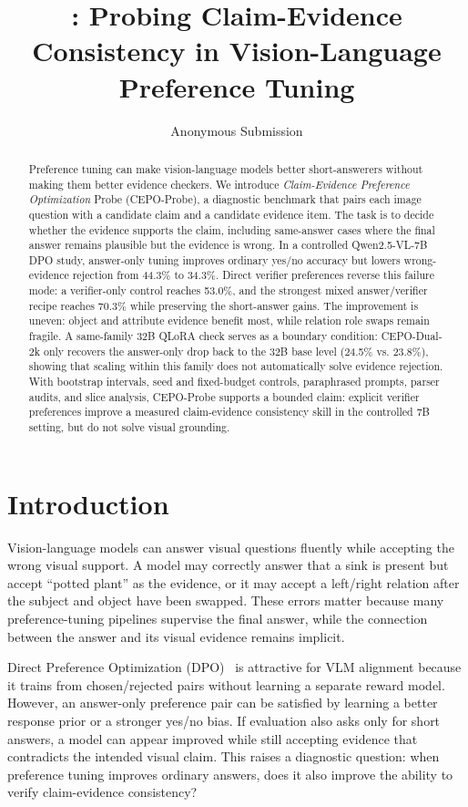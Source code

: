 \documentclass[10pt,twocolumn,letterpaper]{article}
\title{\benchmark{}: Probing Claim-Evidence Consistency in Vision-Language Preference Tuning}
\author{Anonymous \confName{} Submission}
\newcommand{\benchmark}{CEPO-Probe}
\begin{document}
\maketitle

\begin{abstract}
Preference tuning can make vision-language models better short-answerers
without making them better evidence checkers. We introduce \emph{Claim-Evidence
Preference Optimization} Probe (\benchmark{}), a diagnostic benchmark that
pairs each image question with a candidate claim and a candidate evidence item.
The task is to decide whether the evidence supports the claim, including
same-answer cases where the final answer remains plausible but the evidence is
wrong. In a controlled Qwen2.5-VL-7B DPO study, answer-only tuning improves
ordinary yes/no accuracy but lowers wrong-evidence rejection from 44.3\% to
34.3\%. Direct verifier preferences reverse this failure mode: a verifier-only
control reaches 53.0\%, and the strongest mixed answer/verifier recipe reaches
70.3\% while preserving the short-answer gains. The improvement is uneven:
object and attribute evidence benefit most, while relation role swaps remain
fragile. A same-family 32B QLoRA check serves as a boundary condition:
CEPO-Dual-2k only recovers the answer-only drop back to the 32B base level
(24.5\% vs. 23.8\%), showing that scaling within this family does not
automatically solve evidence rejection. With bootstrap intervals, seed and
fixed-budget controls, paraphrased prompts, parser audits, and slice analysis,
\benchmark{} supports a bounded claim: explicit verifier preferences improve a
measured claim-evidence consistency skill in the controlled 7B setting, but do
not solve visual grounding.
\end{abstract}

\section{Introduction}

Vision-language models can answer visual questions fluently while accepting
the wrong visual support. A model may correctly answer that a sink is present
but accept ``potted plant'' as the evidence, or it may accept a left/right
relation after the subject and object have been swapped. These errors matter
because many preference-tuning pipelines supervise the final answer, while the
connection between the answer and its visual evidence remains implicit.

Direct Preference Optimization (DPO)~\cite{dpo} is attractive for VLM
alignment because it trains from chosen/rejected pairs without learning a
separate reward model. However, an answer-only preference pair can be satisfied
by learning a better response prior or a stronger yes/no bias. If evaluation
also asks only for short answers, a model can appear improved while still
accepting evidence that contradicts the intended visual claim. This raises a
diagnostic question: when preference tuning improves ordinary answers, does it
also improve the ability to verify claim-evidence consistency?
\end{document}
